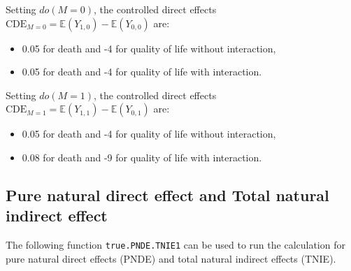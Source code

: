 \documentclass[
]{book}
\providecommand{\tightlist}{%
  \setlength{\itemsep}{0pt}\setlength{\parskip}{0pt}}
\begin{document}
Setting \(do(M=0)\), the controlled direct effects \(\text{CDE}_{M=0} = \mathbb{E}\left(Y_{1,0} \right) - \mathbb{E}\left(Y_{0,0} \right)\) are:

\begin{itemize}
\tightlist
\item
  0.05 for death and -4 for quality of life without interaction,
\item
  0.05 for death and -4 for quality of life with interaction.
\end{itemize}

Setting \(do(M=1)\), the controlled direct effects \(\text{CDE}_{M=1} = \mathbb{E}\left(Y_{1,1} \right) - \mathbb{E}\left(Y_{0,1} \right)\) are:

\begin{itemize}
\tightlist
\item
  0.05 for death and -4 for quality of life without interaction,
\item
  0.08 for death and -9 for quality of life with interaction.
\end{itemize}

\hypertarget{pure-natural-direct-effect-and-total-natural-indirect-effect}{%
\subsection{Pure natural direct effect and Total natural indirect effect}\label{pure-natural-direct-effect-and-total-natural-indirect-effect}}

The following function \texttt{true.PNDE.TNIE1} can be used to run the calculation for pure natural direct effects (PNDE) and total natural indirect effects (TNIE).
\end{document}
